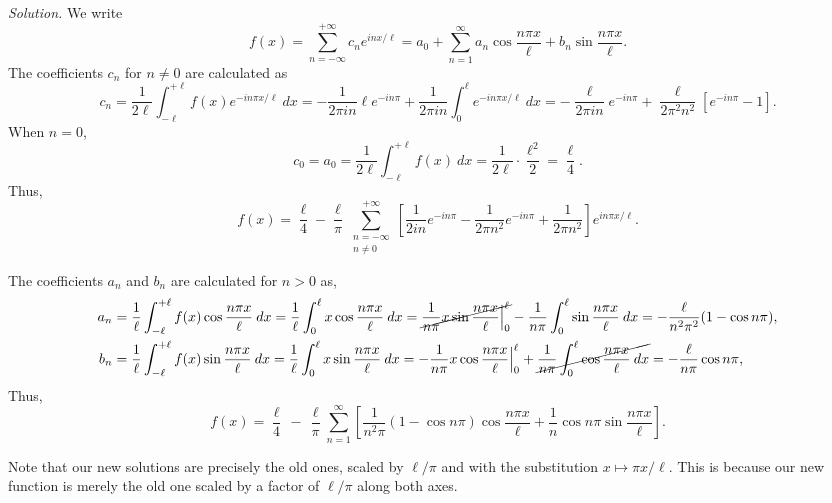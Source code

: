 \documentclass[10pt]{article}
\begin{document}
        \textit{Solution.} We write
        \[
                f(x) = \sum_{n = -\infty}^{+\infty} c_n e^{inx /\ell} = a_0 + \sum_{n = 1}^\infty a_n\cos\frac{n\pi x}{\ell} + b_n\sin\frac{n\pi x}{\ell}.
        \]
        The coefficients $c_n$ for $n \neq 0$ are calculated as
        \[
                c_n = \frac{1}{2\ell} \int_{-\ell}^{+\ell} f(x)e^{-in\pi x /\ell}\:dx
                        = -\frac{1}{2\pi in}\ell e^{-in\pi} + \frac{1}{2\pi in}\int_0^\ell e^{-in\pi x/\ell}\:dx
                        = -\frac{\ell}{2\pi in}e^{-in\pi} + \frac{\ell}{2\pi^2 n^2}\left[e^{-in\pi} - 1\right].
        \]
        When $n = 0$,
        \[
                c_0 = a_0 = \frac{1}{2\ell}\int_{-\ell}^{+\ell} f(x)\:dx = \frac{1}{2\ell}\cdot \frac{\ell^2}{2} = \frac{\ell}{4}.
        \]
        Thus,
        \[
                f(x) = \frac{\ell}{4} - \frac{\ell}{\pi}\sum_{\substack{n = -\infty\\ n \neq 0}}^{+\infty} \left[\frac{1}{2in}e^{-in\pi} - 
                        \frac{1}{2\pi n^2}e^{-in\pi} + \frac{1}{2\pi n^2} \right]e^{in\pi x/\ell}.
        \]
        
        The coefficients $a_n$ and $b_n$ are calculated for $n > 0$ as,
        \begin{align*}
                a_n &= \frac{1}{\ell}\int_{-\ell}^{+\ell} f(x)\cos\frac{n\pi x}{\ell}\:dx 
                        = \frac{1}{\ell}\int_0^\ell x\cos\frac{n\pi x}{\ell}\:dx 
                        = \cancel{\frac{1}{n\pi}x\sin\frac{n\pi x}{\ell}\Big|_0^\ell} - \frac{1}{n\pi}\int_0^\ell \sin\frac{n\pi x}{\ell}\:dx 
                        = -\frac{\ell}{n^2\pi^2}(1 - \cos{n\pi}), \\
                b_n &= \frac{1}{\ell}\int_{-\ell}^{+\ell} f(x)\sin\frac{n\pi x}{\ell}\:dx 
                        = \frac{1}{\ell}\int_0^\ell x\sin\frac{n\pi x}{\ell}\:dx 
                        = -\frac{1}{n\pi}x\cos\frac{n\pi x}{\ell}\Big|_0^\ell + \cancel{\frac{1}{n\pi}\int_0^\ell \cos\frac{n\pi x}{\ell}\:dx }
                        = -\frac{\ell}{n\pi}\cos{n\pi}, \\
        \end{align*}
        Thus,
        \[
                f(x) = \frac{\ell}{4} \,-\, \frac{\ell}{\pi}\sum_{n = 1}^\infty\left[ \frac{1}{n^2\pi}(1 - \cos{n\pi})\cos\frac{n\pi x}{\ell} + 
                        \frac{1}{n}\cos{n\pi}\sin\frac{n\pi x}{\ell} \right].
        \]

        Note that our new solutions are precisely the old ones, scaled by $\ell/\pi$ and with the substitution $x \mapsto \pi x/\ell$.
        This is because our new function is merely the old one scaled by a factor of $\ell/\pi$ along both axes.
\end{document}
